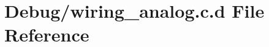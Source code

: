 \hypertarget{_debug_2wiring__analog_8c_8d}{\section{\-Debug/wiring\-\_\-analog.c.\-d \-File \-Reference}
\label{_debug_2wiring__analog_8c_8d}
}
